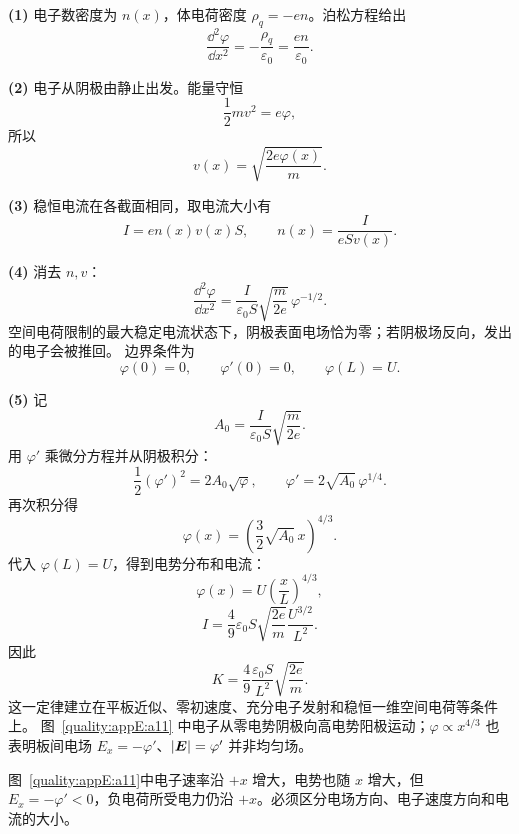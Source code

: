 \begin{xesolution}
\textbf{(1)} 电子数密度为 $n(x)$，体电荷密度 $\rho_q=-en$。泊松方程给出
\begin{equation}
  \frac{\dd^2\varphi}{\dd x^2}=-\frac{\rho_q}{\varepsilon_0}
  =\frac{en}{\varepsilon_0}.
\end{equation}

\textbf{(2)} 电子从阴极由静止出发。能量守恒
\[
  \frac12mv^2=e\varphi,
\]
所以
\begin{equation}
  \boxed{v(x)=\sqrt{\frac{2e\varphi(x)}m}}.
\end{equation}

\textbf{(3)} 稳恒电流在各截面相同，取电流大小有
\begin{equation}
  I=en(x)v(x)S,
  \qquad
  \boxed{n(x)=\frac{I}{eSv(x)}}.
\end{equation}

\textbf{(4)} 消去 $n,v$：
\begin{equation}
  \frac{\dd^2\varphi}{\dd x^2}
  =\frac{I}{\varepsilon_0S}\sqrt{\frac{m}{2e}}\,\varphi^{-1/2}.
\end{equation}
空间电荷限制的最大稳定电流状态下，阴极表面电场恰为零；若阴极场反向，发出的电子会被推回。
边界条件为
\begin{equation}
  \varphi(0)=0,
  \qquad \varphi'(0)=0,
  \qquad \varphi(L)=U.
\end{equation}

\textbf{(5)} 记
\[
  A_0=\frac{I}{\varepsilon_0S}\sqrt{\frac{m}{2e}}.
\]
用 $\varphi'$ 乘微分方程并从阴极积分：
\[
  \frac12(\varphi')^2=2A_0\sqrt\varphi,
  \qquad
  \varphi'=2\sqrt{A_0}\,\varphi^{1/4}.
\]
再次积分得
\[
  \varphi(x)=\left(\frac32\sqrt{A_0}\,x\right)^{4/3}.
\]
代入 $\varphi(L)=U$，得到电势分布和电流：
\begin{equation}
  \boxed{\varphi(x)=U\left(\frac xL\right)^{4/3}},
\end{equation}
\begin{equation}
  \boxed{I=\frac49\varepsilon_0S\sqrt{\frac{2e}{m}}
  \frac{U^{3/2}}{L^2}}.
\end{equation}
因此
\begin{equation}
  \boxed{K=\frac49\frac{\varepsilon_0S}{L^2}\sqrt{\frac{2e}{m}}}.
\end{equation}
这一定律建立在平板近似、零初速度、充分电子发射和稳恒一维空间电荷等条件上。
图~\ref{quality:appE:a11} 中电子从零电势阴极向高电势阳极运动；$\varphi\propto x^{4/3}$ 也表明板间电场
$E_x=-\varphi'$、$|\bm{E}|=\varphi'$ 并非均匀场。


图~\ref{quality:appE:a11}中电子速率沿 $+x$ 增大，电势也随 $x$ 增大，但 $E_x=-\varphi'<0$，负电荷所受电力仍沿 $+x$。必须区分电场方向、电子速度方向和电流的大小。
\end{xesolution}

